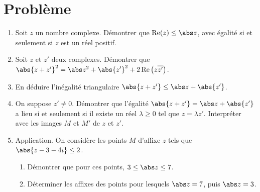 \mxnewpage
\section{Problème}
\begin{problem}
\begin{enumerate}
\item Soit $z$ un nombre complexe. Démontrer que $\operatorname{Re}(z)\le\abs z$, avec égalité si et seulement si $z$ est un réel positif.
\item Soit $z$ et $z'$ deux complexes. Démontrer que $\abs{z+z'}^2=\abs z^2+\abs{z'}^2+2\operatorname{Re}\left(z\overline{z'}\right)$.
\item En déduire l'inégalité triangulaire $\abs{z+z'}\le\abs z+\abs{z'}$.
\item On suppose $z'\neq0$. Démontrer que l'égalité $\abs{z+z'}=\abs z+\abs{z'}$ a lieu si et seulement si il existe un réel $\lambda\ge0$ tel que $z=\lambda z'$. Interpréter avec les images $M$ et $M'$ de $z$ et $z'$.
\item Application. On considère les points $M$ d'affixe $z$ tels que $\abs{z-3-4i}\le2$.
\begin{enumerate}
\item Démontrer que pour ces points, $3\le\abs z\le7$.
\item Déterminer les affixes des points pour lesquels $\abs z=7$, puis $\abs z=3$.
\end{enumerate}
\end{enumerate}
\end{problem}
